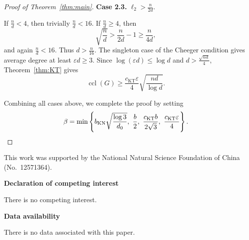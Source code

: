\documentclass[11pt,a4paper]{article}
\theoremstyle{definition}
\theoremstyle{remark}
\DeclareMathOperator{\ccl}{ccl}
\newcommand{\eps}{\varepsilon}
\begin{document}
\begin{proof}[Proof of Theorem~\ref{thm:main}]
\noindent
{\bf Case 2.3.}  $\ell_2>\frac{n}{2d}$. 

If
$\frac{n}{d}<4$, then trivially $\frac{n}{d}<16$. If
$\frac{n}{d}\ge4$, then
\[
 \sqrt{\frac{n}{d}}>\frac{n}{2d}-1\ge\frac{n}{4d},
\]
and again $\frac{n}{d}<16$. Thus $d>\frac{n}{16}$. The singleton
case of the Cheeger
condition gives average degree at least $\eps d\ge3$. Since
$\log(\eps d)\le\log d$ and $d>\frac{\sqrt{nd}}{4}$,
Theorem~\ref{thm:KT} gives
\[
 \ccl(G)\ge\frac{c_{\mathrm{KT}}\eps}{4}
             \sqrt{\frac{nd}{\log d}}.
\]

Combining all cases above, we  complete the proof by setting
\[
 \beta=\min\left\{
 b_{\mathrm{KN}}\sqrt{\frac{\log 3}{d_0}},\
 \frac{b}{2},\
 \frac{c_{\mathrm{KT}}b}{2\sqrt{3}},\
 \frac{c_{\mathrm{KT}}\eps}{4}
 \right\}. \qedhere
\]
\end{proof}


\bigskip

This work was supported by the National Natural Science Foundation of China (No.~12571364).

\bigskip

\noindent\textbf{Declaration of competing interest}

\noindent There is no competing interest.

\medskip
\noindent\textbf{Data availability}

\noindent There is no data associated with this paper.
\end{document}
